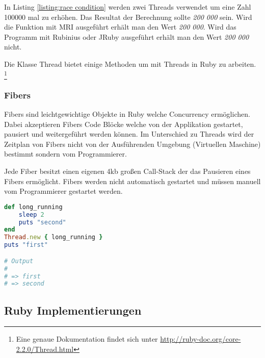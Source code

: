 In Listing \ref{listing:race condition} werden zwei Threads verwendet um eine Zahl 100000 mal zu erhöhen. Das Resultat der Berechnung sollte \emph{200 000} sein. Wird die Funktion mit MRI ausgeführt erhält man den Wert \emph{200 000}. Wird das Programm mit Rubinius oder JRuby ausgeführt erhält man den Wert \emph{200 000} nicht. 































Die Klasse Thread bietet einige Methoden um mit Threads in Ruby zu arbeiten. \footnote{Eine genaue Dokumentation findet sich unter \url{http://ruby-doc.org/core-2.2.0/Thread.html}}

\subsubsection{Fibers}
Fibers sind leichtgewichtige Objekte in Ruby welche Concurrency ermöglichen. Dabei akzeptieren Fibers Code Blöcke welche von der Applikation gestartet, pausiert und weitergeführt werden können. Im Unterschied zu Threads wird der Zeitplan von Fibers nicht von der Ausführenden Umgebung (Virtuellen Maschine) bestimmt sondern vom Programmierer. 

Jede Fiber besitzt einen eigenen 4kb großen Call-Stack der das Pausieren eines Fibers ermöglicht. Fibers werden nicht automatisch gestartet und müssen manuell vom Programmierer gestartet werden.

\begin{lstlisting}[language=Ruby,label=lst:thread_example]
def long_running
	sleep 2
	puts "second"
end
Thread.new { long_running }
puts "first"

# Output
#
# => first
# => second

\end{lstlisting}



\subsection{Ruby Implementierungen}

